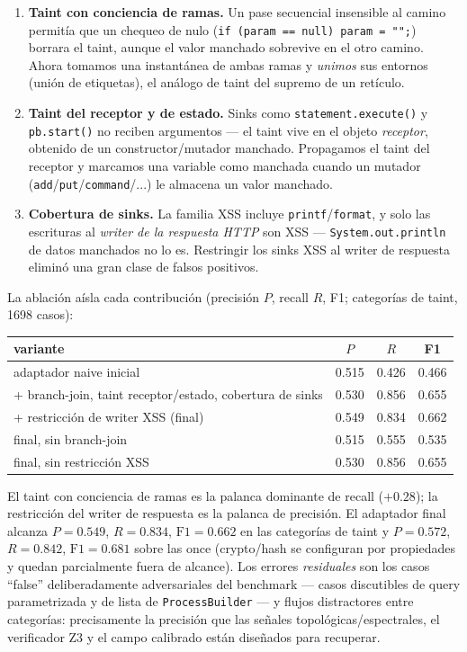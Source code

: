 \documentclass[11pt]{article}
\begin{document}
\begin{enumerate}[label=(\roman*)]
  \item \textbf{Taint con conciencia de ramas.} Un pase secuencial
        insensible al camino permitía que un chequeo de nulo
        (\texttt{if (param == null) param = "";}) borrara el taint, aunque el
        valor manchado sobrevive en el otro camino. Ahora tomamos una instantánea
        de ambas ramas y \emph{unimos} sus entornos (unión de etiquetas), el
        análogo de taint del supremo de un retículo.
  \item \textbf{Taint del receptor y de estado.} Sinks como
        \texttt{statement.execute()} y \texttt{pb.start()} no reciben argumentos
        --- el taint vive en el objeto \emph{receptor}, obtenido de un
        constructor/mutador manchado. Propagamos el taint del receptor y
        marcamos una variable como manchada cuando un mutador
        (\texttt{add}/\texttt{put}/\texttt{command}/...) le almacena un valor
        manchado.
  \item \textbf{Cobertura de sinks.} La familia XSS incluye
        \texttt{printf}/\texttt{format}, y solo las escrituras al \emph{writer de
        la respuesta HTTP} son XSS --- \texttt{System.out.println} de datos
        manchados no lo es. Restringir los sinks XSS al writer de respuesta
        eliminó una gran clase de falsos positivos.
\end{enumerate}

La ablación aísla cada contribución (precisión $P$, recall $R$, F1; categorías de
taint, 1698 casos):
\begin{center}
\begin{tabular}{lccc}
\toprule
variante & $P$ & $R$ & F1 \\
\midrule
adaptador naive inicial & 0.515 & 0.426 & 0.466 \\
+ branch-join, taint receptor/estado, cobertura de sinks & 0.530 & 0.856 & 0.655 \\
+ restricción de writer XSS (final) & 0.549 & 0.834 & 0.662 \\
\midrule
final, sin branch-join & 0.515 & 0.555 & 0.535 \\
final, sin restricción XSS & 0.530 & 0.856 & 0.655 \\
\bottomrule
\end{tabular}
\end{center}
El taint con conciencia de ramas es la palanca dominante de recall ($+0.28$); la
restricción del writer de respuesta es la palanca de precisión. El adaptador
final alcanza $P=0.549$, $R=0.834$, $\mathrm{F1}=0.662$ en las categorías de
taint y $P=0.572$, $R=0.842$, $\mathrm{F1}=0.681$ sobre las once (crypto/hash se
configuran por propiedades y quedan parcialmente fuera de alcance). Los errores
\emph{residuales} son los casos ``false'' deliberadamente adversariales del
benchmark --- casos discutibles de query parametrizada y de lista de
\texttt{ProcessBuilder} --- y flujos distractores entre categorías: precisamente
la precisión que las señales topológicas/espectrales, el verificador Z3 y el
campo calibrado están diseñados para recuperar.
\end{document}
